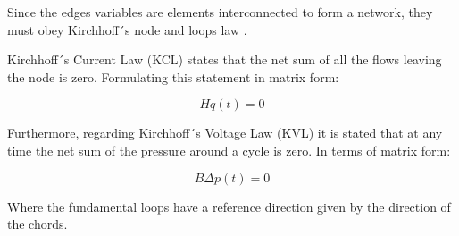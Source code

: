 Since the edges variables are elements interconnected to form a network, 
they must obey Kirchhoff´s node and loops law \cite{GraphModel}. 

Kirchhoff´s Current Law (KCL) states that the net sum of all the flows 
leaving the node is zero. Formulating this statement in matrix form:

\begin{equation}
  Hq(t) = 0
\end{equation}

Furthermore, regarding Kirchhoff´s Voltage Law (KVL) it is stated that at any time the net sum of the pressure around a cycle 
is zero. In terms of matrix form:

\begin{equation}
  B\Delta p (t) = 0
\end{equation}

Where the fundamental loops have a reference direction given by the direction of the 
chords. 





 